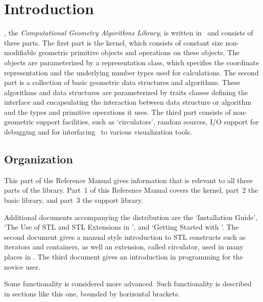 
\chapter{Introduction}

\cgal, the {\em Computational Geometry Algorithms Library}, is written in 
\CC\ and consists of three parts.
The first part is the kernel, which consists of constant size non-modifiable 
geometric primitive objects and operations on these objects. 
The objects are parameterized by a representation class, which specifies
the coordinate representation and the underlying number types used for 
calculations.
The second part is a collection of basic geometric data structures and
algorithms. 
These algorithms and data structures are parameterized by traits classes
defining the interface and encapsulating the interaction between data structure 
or algorithm and the types and primitive operations it uses.
The third part consists of non-geometric support facilities, such as 
`circulators', random sources, I/O support for debugging and for interfacing 
\cgal\ to various visualization tools.

\section{Organization}
This part of the Reference Manual gives information that is relevant to 
all three parts of the library.
Part~1 of this Reference Manual covers the kernel, part~2 the basic 
library, and part~3 the support library.

Additional documents accompanying the {\cgal} distribution are 
the `Installation Guide',
`The Use of STL and STL Extensions in {\cgal}', and 
`Getting Started with {\cgal}'.
The second document gives a manual style introduction to STL constructs such 
as iterators and containers, as well an extension, called circulator, used
in many places in {\cgal}.
The third document gives an introduction in {\cgal} programming for the 
novice user.

\begin{ccAdvanced}
Some functionality is considered more advanced.
Such functionality is described in sections like this one, bounded by
horizontal brackets.
\end{ccAdvanced}

